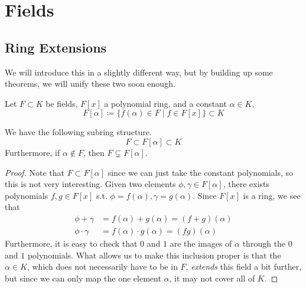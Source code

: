 \section{Fields}

\subsection{Ring Extensions}

  We will introduce this in a slightly different way, but by building up some theorems, we will unify these two soon enough. 
  
  \begin{definition} 
    Let $F \subset K$ be fields, $F[x]$ a polynomial ring, and a constant $\alpha \in K$, 
    \begin{equation}
      F[\alpha] \coloneqq \{ f(\alpha) \in F \mid f \in F[x]\} \subset K
    \end{equation}
  \end{definition} 

  \begin{lemma} 
    We have the following subring structure. 
    \begin{equation}
      F \subset F[\alpha] \subset K
    \end{equation}
    Furthermore, if $\alpha \not\in F$, then $F \subsetneq F[\alpha]$. 
  \end{lemma}
  \begin{proof}
    Note that $F \subset F[\alpha]$ since we can just take the constant polynomials, so this is not very interesting. Given two elements $\phi, \gamma \in F[\alpha]$, there exists polynomials $f, g \in F[x]$ s.t. $\phi = f(\alpha), \gamma = g(\alpha)$. Since $F[x]$ is a ring, we see that 
    \begin{align}
      \phi + \gamma & = f(\alpha) + g(\alpha) = (f + g)(\alpha) \\
      \phi \cdot \gamma & = f(\alpha) \cdot g(\alpha) = (fg)(\alpha)
    \end{align} 
    Furthermore, it is easy to check that $0$ and $1$ are the images of $\alpha$ through the $0$ and $1$ polynomials. What allows us to make this inclusion proper is that the $\alpha \in K$, which does not necessarily have to be in $F$, \textit{extends} this field a bit further, but since we can only map the one element $\alpha$, it may not cover all of $K$. 
  \end{proof} 

